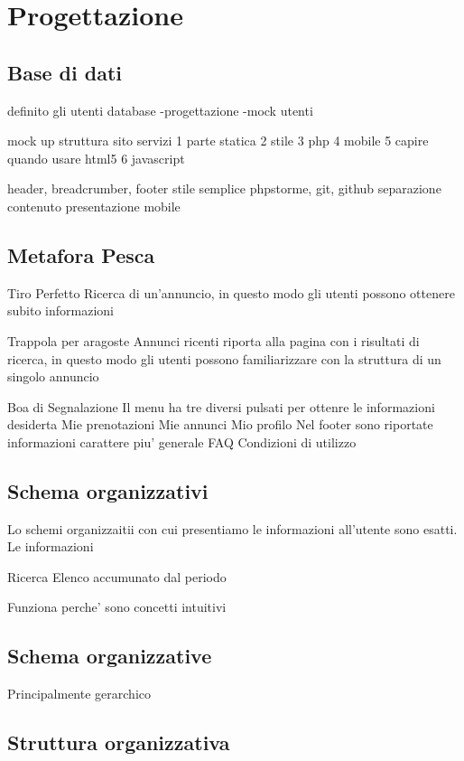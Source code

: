 \documentclass[1_relazione.tex]{subfiles}
\begin{document}
\section{Progettazione}

\subsection{Base di dati}


definito gli utenti
database
-progettazione
-mock utenti

mock up struttura sito 
servizi
1 parte statica
2 stile
3 php
4 mobile
5 capire quando usare html5
6 javascript

header, breadcrumber, footer
stile semplice
phpstorme, git, github
separazione contenuto presentazione 
mobile


\subsection{Metafora Pesca}

Tiro Perfetto
Ricerca di un'annuncio, in questo modo gli utenti possono ottenere subito informazioni

Trappola per aragoste
Annunci ricenti riporta alla pagina con i risultati di ricerca, in questo modo gli utenti possono familiarizzare con la struttura di un singolo annuncio

Boa di Segnalazione
Il menu ha tre diversi pulsati per ottenre le informazioni desiderta
Mie prenotazioni
Mie annunci
Mio profilo
Nel footer sono riportate informazioni carattere piu' generale
FAQ
Condizioni di utilizzo

\subsection{Schema organizzativi}
Lo schemi organizzaitii con cui presentiamo le informazioni all'utente sono esatti. Le informazioni 




Ricerca
Elenco accumunato dal periodo 

Funziona perche' sono concetti intuitivi


\subsection{Schema organizzative}
Principalmente gerarchico

\subsection{Struttura organizzativa}
\end{document}
